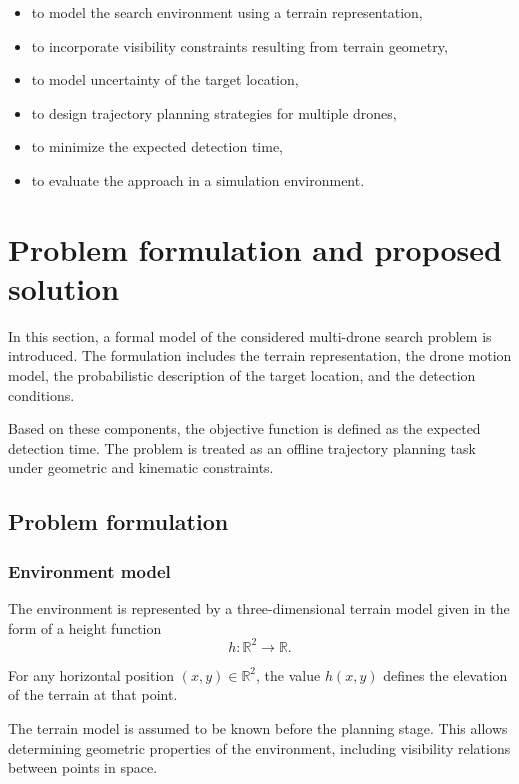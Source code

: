 \documentclass[english]{projectreport}
\begin{document}
\begin{itemize}
    \item to model the search environment using a terrain representation,
    \item to incorporate visibility constraints resulting from terrain geometry,
    \item to model uncertainty of the target location,
    \item to design trajectory planning strategies for multiple drones,
    \item to minimize the expected detection time,
    \item to evaluate the approach in a simulation environment.
\end{itemize}

\section{Problem formulation and proposed solution}

In this section, a formal model of the considered multi-drone search problem is introduced. The formulation includes the terrain representation, the drone motion model, the probabilistic description of the target location, and the detection conditions.

Based on these components, the objective function is defined as the expected detection time. The problem is treated as an offline trajectory planning task under geometric and kinematic constraints.

\subsection{Problem formulation}

\subsubsection{Environment model}

The environment is represented by a three-dimensional terrain model given in the form of a height function
\begin{equation}
h : \mathbb{R}^2 \rightarrow \mathbb{R}.
\end{equation}

For any horizontal position $(x, y) \in \mathbb{R}^2$, the value $h(x, y)$ defines the elevation of the terrain at that point.

The terrain model is assumed to be known before the planning stage. This allows determining geometric properties of the environment, including visibility relations between points in space.
\end{document}
